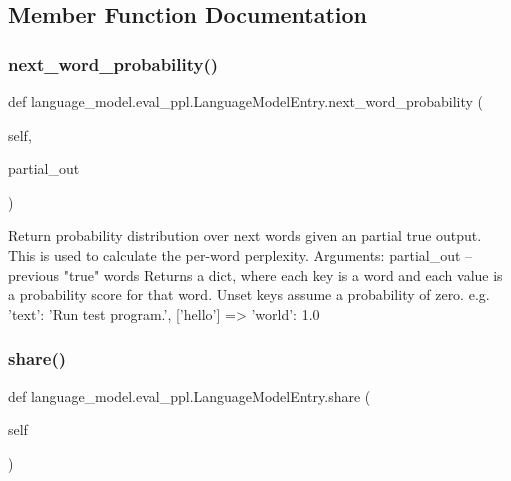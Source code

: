 \subsection{Member Function Documentation}
\mbox{\label{classlanguage__model_1_1eval__ppl_1_1LanguageModelEntry_a16e77aba535b4451ea5071723e271336}} 
\subsubsection{\texorpdfstring{next\+\_\+word\+\_\+probability()}{next\_word\_probability()}}
{\footnotesize\ttfamily def language\+\_\+model.\+eval\+\_\+ppl.\+Language\+Model\+Entry.\+next\+\_\+word\+\_\+probability (\begin{DoxyParamCaption}\item[{}]{self,  }\item[{}]{partial\+\_\+out }\end{DoxyParamCaption})}

\begin{DoxyVerb}Return probability distribution over next words given an partial
true output. This is used to calculate the per-word perplexity.
Arguments:
partial_out -- previous "true" words
Returns a dict, where each key is a word and each value is a probability
score for that word. Unset keys assume a probability of zero.
e.g.
{'text': 'Run test program.'}, ['hello'] => {'world': 1.0}
\end{DoxyVerb}
 \mbox{\label{classlanguage__model_1_1eval__ppl_1_1LanguageModelEntry_a3a4b8adc4c891d9de5626b7c15e088a8}} 
\subsubsection{\texorpdfstring{share()}{share()}}
{\footnotesize\ttfamily def language\+\_\+model.\+eval\+\_\+ppl.\+Language\+Model\+Entry.\+share (\begin{DoxyParamCaption}\item[{}]{self }\end{DoxyParamCaption})}



